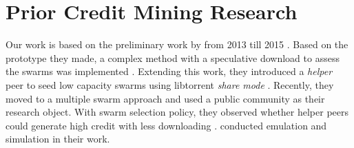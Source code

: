 




%



\section{Prior Credit Mining Research}
\label{section:cmprior}
Our work is based on the preliminary work by \citeauthor{2015:creditmining:capota} from 2013 till 2015 \cite{2015:creditmining:capota, 2013:investmentcm:capota, 2014:bwmarket:capota}. Based on the prototype they made, a complex method with a speculative download to assess the swarms was implemented \cite{2013:investmentcm:capota}. Extending this work, they introduced a \textit{helper} peer to seed low capacity swarms using libtorrent \textit{share mode} \cite{2014:bwmarket:capota}. Recently, they moved to a multiple swarm approach and used a public community as their research object. With swarm selection policy, they observed whether helper peers could generate high credit with less downloading \cite{2015:creditmining:capota}. \citeauthor{2015:creditmining:capota} conducted emulation and simulation in their work.

